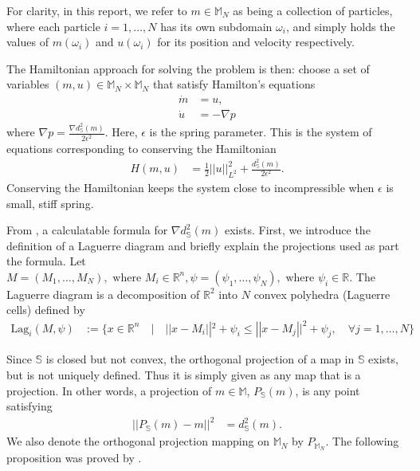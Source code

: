 \documentclass[11pt, oneside]{article}   	%
\newcommand{\R}{\mathbb{R}}
\newcommand{\MN}{\mathbb{M}_N}
\newcommand{\dsmsq}{d^{2}_{\mathbb{S}}(m)}
\newcommand{\graddsmsq}{\nabla{d^{2}_{\mathbb{S}}(m)}}
\newcommand{\M}{\mathbb{M}}
\newcommand{\Sb}{\mathbb{S}}
\begin{document}
For clarity, in this report, we refer to \(m \in \MN\)  as being a collection of particles, where each particle \(i=1,\dots,N\) has its own subdomain \(\omega_i\), and simply holds the values of \(m(\omega_i)\) and \(u(\omega_i)\) for its position and velocity respectively.

The Hamiltonian approach for solving the problem is then: choose a set of variables \((m, u) \in \MN \times \MN \) that satisfy Hamilton's equations
\begin{align} 
\dot{m} &= u, \\
\dot{u} &= - \nabla p
\end{align}
where \(\nabla p = \frac{\graddsmsq}{2\epsilon^2}\). Here, \(\epsilon\) is the spring parameter. This is the system of equations corresponding to conserving the Hamiltonian
\begin{align} 
H(m, u) &= \frac{1}{2} ||u||^2_{L^2} + \frac{\dsmsq}{2\epsilon^2}.
\end{align}
Conserving the Hamiltonian keeps the system close to incompressible when \(\epsilon\) is small,  stiff spring. 

From \cite{gallouet2016lagrangian}, a calculatable formula for \(\graddsmsq\) exists. First, we introduce the definition of a Laguerre diagram and briefly explain the projections used as part the formula. Let \(M = (M_1,\dots,M_N), \text{ where } M_i \in \R^n, \psi = (\psi_1,\dots,\psi_N), \text{ where } \psi_i \in \R\). The Laguerre diagram is a decomposition of \(\R^2\) into \(N\) convex polyhedra (Laguerre cells) defined by
\begin{align}
\mathrm{Lag}_i(M, \psi) &:= \{x \in \R^n \quad | \quad || x - M_i ||^2 + \psi_i \le || x - M_j ||^2 + \psi_j, \quad \forall j = 1,\dots,N\}
\end{align}

Since \(\Sb\) is closed but not convex, the orthogonal projection of a map in \(\Sb\) exists, but is not uniquely defined. Thus it is simply given as any map that is a projection. In other words, a projection of \(m \in \M\), \(P_\Sb(m)\), is any point satisfying
\begin{align}
|| P_\Sb(m) - m ||^2 &= \dsmsq.
\end{align}
We also denote the orthogonal projection mapping on \(\MN\) by \(P_{\MN}\). The following proposition was proved by \cite{gallouet2016lagrangian}.
\end{document}
